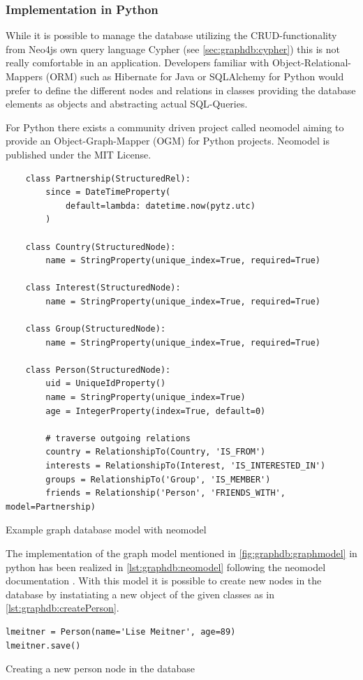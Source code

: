 \subsubsection{Implementation in Python}
While it is possible to manage the database utilizing the CRUD-functionality from Neo4js own query language Cypher (see \ref{sec:graphdb:cypher}) this is not really comfortable in an application.
Developers familiar with Object-Relational-Mappers (ORM) such as Hibernate for Java or SQLAlchemy for Python would prefer to define the different nodes and relations in classes providing the database elements as objects and abstracting actual SQL-Queries.

For Python there exists a community driven project called neomodel \autocite{github:neomodel} aiming to provide an Object-Graph-Mapper (OGM) for Python projects. Neomodel is published under the MIT License.

\begin{listing}[ht]
    \begin{verbatim}
    class Partnership(StructuredRel):
        since = DateTimeProperty(
            default=lambda: datetime.now(pytz.utc)
        )

    class Country(StructuredNode):
        name = StringProperty(unique_index=True, required=True)

    class Interest(StructuredNode):
        name = StringProperty(unique_index=True, required=True)

    class Group(StructuredNode):
        name = StringProperty(unique_index=True, required=True)

    class Person(StructuredNode):
        uid = UniqueIdProperty()
        name = StringProperty(unique_index=True)
        age = IntegerProperty(index=True, default=0)

        # traverse outgoing relations
        country = RelationshipTo(Country, 'IS_FROM')
        interests = RelationshipTo(Interest, 'IS_INTERESTED_IN')
        groups = RelationshipTo('Group', 'IS_MEMBER')
        friends = Relationship('Person', 'FRIENDS_WITH', model=Partnership)
    \end{verbatim}
    \caption{Example graph database model with neomodel}
    \label{lst:graphdb:neomodel}
\end{listing}

The implementation of the graph model mentioned in \autoref{fig:graphdb:graphmodel} in python has been realized in \autoref{lst:graphdb:neomodel} following the neomodel documentation \autocite{neomodel:rtd}. With this model it is possible to create new nodes in the database by instatiating a new object of the given classes as in \autoref{lst:graphdb:createPerson}.
\begin{listing}[H]
\begin{verbatim}
lmeitner = Person(name='Lise Meitner', age=89)
lmeitner.save()
\end{verbatim}
\caption{Creating a new person node in the database}
\label{lst:graphdb:createPerson}
\end{listing}

